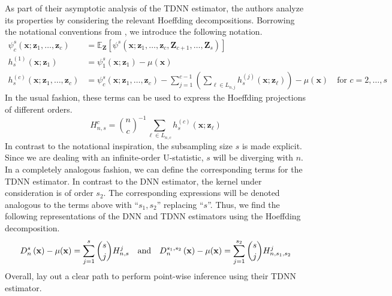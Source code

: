 \documentclass[letterpaper,10pt]{article}
\numberwithin{equation}{section}
\numberwithin{theorem}{section}
\theoremstyle{definition}
\newcommand{\1}{\mathbb{1}}
\begin{document}
As part of their asymptotic analysis of the TDNN estimator, the authors analyze its properties by considering the relevant Hoeffding decompositions.
Borrowing the notational conventions from \citet{lee_u-statistics_2019}, we introduce the following notation.
\begin{align}
	\psi_{c}^{s}(\mathbf{x}; \mathbf{z}_{1}, \dotsc, \mathbf{z}_{c})
	 & = \mathbb{E}_{\mathbf{Z}}\left[\psi^{s}\left(\mathbf{x}; \mathbf{z}_{1}, \dotsc, \mathbf{z}_{c}, \mathbf{Z}_{c+1}, \dotsc, \mathbf{Z}_{s}\right)\right]                                 \\
	h_{s}^{(1)}\left(\mathbf{x}; \mathbf{z}_{1}\right)
	 & = \psi_{1}^{s}(\mathbf{x}; \mathbf{z}_{1}) - \mu(\mathbf{x})                                                                                                                            \\
	h_{s}^{(c)}\left(\mathbf{x}; \mathbf{z}_{1}, \dotsc, \mathbf{z}_{c}\right)
	 & = \psi_{c}^{s}(\mathbf{x}; \mathbf{z}_{1}, \dotsc, \mathbf{z}_{c}) - \sum_{j = 1}^{c-1}\left(\sum_{\ell \in L_{n,j}}h_{s}^{(j)}(\mathbf{x}; \mathbf{z}_{\ell})\right) - \mu(\mathbf{x})
	\quad \text{for } c = 2, \dotsc, s
\end{align}
In the usual fashion, these terms can be used to express the Hoeffding projections of different orders.
\begin{equation}
	H_{n,s}^{c}
	= \binom{n}{c}^{-1} \sum_{\ell \in L_{n,c}} h^{(c)}_{s}(\mathbf{x}; \mathbf{z}_{\ell})
\end{equation}
In contrast to the notational inspiration, the subsampling size $s$ is made explicit.
Since we are dealing with an infinite-order U-statistic, $s$ will be diverging with $n$.
In a completely analogous fashion, we can define the corresponding terms for the TDNN estimator.
In contrast to the DNN estimator, the kernel under consideration is of order $s_2$.
The corresponding expressions will be denoted analogous to the terms above with ``$s_1, s_2$'' replacing ``$s$''.
Thus, we find the following representations of the DNN and TDNN estimators using the Hoeffding decomposition.
\begin{equation}
	D_n^s\left(\mathbf{x}\right) - \mu(\mathbf{x})
	= \sum_{j = 1}^{s}\binom{s}{j}H_{n,s}^{j}\\
	\quad \text{and} \quad
	D_n^{s_1,s_2}\left(\mathbf{x}\right) - \mu(\mathbf{x})
	= \sum_{j = 1}^{s_2}\binom{s}{j}H_{n,s_1, s_2}^{j}
\end{equation}
Overall, \citet{demirkaya_optimal_2024} lay out a clear path to perform point-wise inference using their TDNN estimator.
\end{document}
